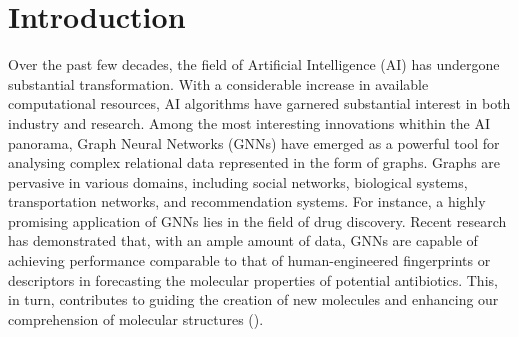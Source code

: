 \documentclass[binding=0.6cm]{sapthesis}
\newcommand{\mycite}[1]{(\cite{#1})}
\begin{document}
\begin{abstract}

\end{abstract}

\tableofcontents
\mainmatter

\chapter{Introduction}
\label{chap:1-intro} 
Over the past few decades, the field of Artificial Intelligence (AI) has undergone substantial transformation. With a considerable increase in available computational resources, AI algorithms have garnered substantial interest in both industry and research. Among the most interesting innovations whithin the AI panorama, Graph Neural Networks (GNNs) have emerged as a powerful tool for analysing complex relational data represented in the form of graphs. Graphs are pervasive in various domains, including social networks, biological systems, transportation networks, and recommendation systems. For instance, a highly promising application of GNNs lies in the field of drug discovery. Recent research has demonstrated that, with an ample amount of data, GNNs are capable of achieving performance comparable to that of human-engineered fingerprints or descriptors in forecasting the molecular properties of potential antibiotics. This, in turn, contributes to guiding the creation of new molecules and enhancing our comprehension of molecular structures \mycite{xiong2020-pushingTB,cheung2020-covid19}. 
\end{document}
